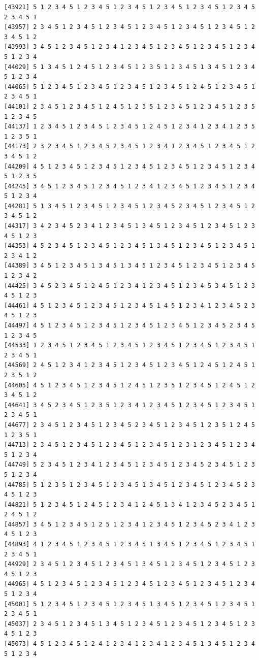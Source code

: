 \documentclass[
  11pt,
]{book}
\begin{document}
\begin{verbatim}
[43921] 5 1 2 3 4 5 1 2 3 4 5 1 2 3 4 5 1 2 3 4 5 1 2 3 4 5 1 2 3 4 5 2 3 4 5 1
[43957] 2 3 4 5 1 2 3 4 5 1 2 3 4 5 1 2 3 4 5 1 2 3 4 5 1 2 3 4 5 1 2 3 4 5 1 2
[43993] 3 4 5 1 2 3 4 5 1 2 3 4 1 2 3 4 5 1 2 3 4 5 1 2 3 4 5 1 2 3 4 5 1 2 3 4
[44029] 5 1 3 4 5 1 2 4 5 1 2 3 4 5 1 2 3 5 1 2 3 4 5 1 3 4 5 1 2 3 4 5 1 2 3 4
[44065] 5 1 2 3 4 5 1 2 3 4 5 1 2 3 4 5 1 2 3 4 5 1 2 4 5 1 2 3 4 5 1 2 3 4 5 1
[44101] 2 3 4 5 1 2 3 4 5 1 2 4 5 1 2 3 5 1 2 3 4 5 1 2 3 4 5 1 2 3 5 1 2 3 4 5
[44137] 1 2 3 4 5 1 2 3 4 5 1 2 3 4 5 1 2 4 5 1 2 3 4 1 2 3 4 1 2 3 5 1 2 3 5 1
[44173] 2 3 2 3 4 5 1 2 3 4 5 2 3 4 5 1 2 3 4 1 2 3 4 5 1 2 3 4 5 1 2 3 4 5 1 2
[44209] 4 5 1 2 3 4 5 1 2 3 4 5 1 2 3 4 5 1 2 3 4 5 1 2 3 4 5 1 2 3 4 5 1 2 3 5
[44245] 3 4 5 1 2 3 4 5 1 2 3 4 5 1 2 3 4 1 2 3 4 5 1 2 3 4 5 1 2 3 4 5 1 2 3 4
[44281] 5 1 3 4 5 1 2 3 4 5 1 2 3 4 5 1 2 3 4 5 2 3 4 5 1 2 3 4 5 1 2 3 4 5 1 2
[44317] 3 4 2 3 4 5 2 3 4 1 2 3 4 5 1 3 4 5 1 2 3 4 5 1 2 3 4 5 1 2 3 4 5 1 2 3
[44353] 4 5 2 3 4 5 1 2 3 4 5 1 2 3 4 5 1 3 4 5 1 2 3 4 5 1 2 3 4 5 1 2 3 4 1 2
[44389] 3 4 5 1 2 3 4 5 1 3 4 5 1 3 4 5 1 2 3 4 5 1 2 3 4 5 1 2 3 4 5 1 2 3 4 2
[44425] 3 4 5 2 3 4 5 1 2 4 5 1 2 3 4 1 2 3 4 5 1 2 3 4 5 3 4 5 1 2 3 4 5 1 2 3
[44461] 4 5 1 2 3 4 5 1 2 3 4 5 1 2 3 4 5 1 4 5 1 2 3 4 1 2 3 4 5 2 3 4 5 1 2 3
[44497] 4 5 1 2 3 4 5 1 2 3 4 5 1 2 3 4 5 1 2 3 4 5 1 2 3 4 5 2 3 4 5 1 2 3 4 5
[44533] 1 2 3 4 5 1 2 3 4 5 1 2 3 4 5 1 2 3 4 5 1 2 3 4 5 1 2 3 4 5 1 2 3 4 5 1
[44569] 2 4 5 1 2 3 4 1 2 3 4 5 1 2 3 4 5 1 2 3 4 5 1 2 4 5 1 2 4 5 1 2 3 5 1 2
[44605] 4 5 1 2 3 4 5 1 2 3 4 5 1 2 4 5 1 2 3 5 1 2 3 4 5 1 2 4 5 1 2 3 4 5 1 2
[44641] 3 4 5 2 3 4 5 1 2 3 5 1 2 3 4 1 2 3 4 5 1 2 3 4 5 1 2 3 4 5 1 2 3 4 5 1
[44677] 2 3 4 5 1 2 3 4 5 1 2 3 4 5 2 3 4 5 1 2 3 4 5 1 2 3 5 1 2 4 5 1 2 3 5 1
[44713] 2 3 4 5 1 2 3 4 5 1 2 3 4 5 1 2 3 4 5 1 2 3 1 2 3 4 5 1 2 3 4 5 1 2 3 4
[44749] 5 2 3 4 5 1 2 3 4 1 2 3 4 5 1 2 3 4 5 1 2 3 4 5 2 3 4 5 1 2 3 5 1 2 3 4
[44785] 5 1 2 3 5 1 2 3 4 5 1 2 3 4 5 1 3 4 5 1 2 3 4 5 1 2 3 4 5 2 3 4 5 1 2 3
[44821] 5 1 2 3 4 5 1 2 4 5 1 2 3 4 1 2 4 5 1 3 4 1 2 3 4 5 2 3 4 5 1 2 4 5 1 2
[44857] 3 4 5 1 2 3 4 5 1 2 5 1 2 3 4 1 2 3 4 5 1 2 3 4 5 2 3 4 1 2 3 4 5 1 2 3
[44893] 4 1 2 3 4 5 1 2 3 4 5 1 2 3 4 5 1 3 4 5 1 2 3 4 5 1 2 3 4 5 1 2 3 4 5 1
[44929] 2 3 4 5 1 2 3 4 5 1 2 3 4 5 1 3 4 5 1 2 3 4 5 1 2 3 4 5 1 2 3 4 5 1 2 3
[44965] 4 5 1 2 3 4 5 1 2 3 4 5 1 2 3 4 5 1 2 3 4 5 1 2 3 4 5 1 2 3 4 5 1 2 3 4
[45001] 5 1 2 3 4 5 1 2 3 4 5 1 2 3 4 5 1 3 4 5 1 2 3 4 5 1 2 3 4 5 1 2 3 4 5 1
[45037] 2 3 4 5 1 2 3 4 5 1 3 4 5 1 2 3 4 5 1 2 3 4 5 1 2 3 4 5 1 2 3 4 5 1 2 3
[45073] 4 5 1 2 3 4 5 1 2 4 1 2 3 4 1 2 3 4 1 2 3 4 5 1 3 4 5 1 2 3 4 5 1 2 3 4

\end{verbatim}
\end{document}
